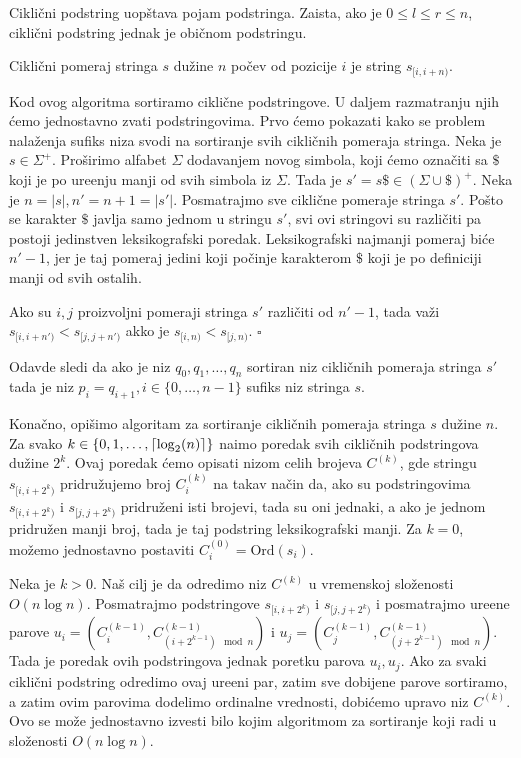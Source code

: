 Cikli\v cni podstring uop\v stava pojam podstringa. Zaista, ako je $0 \leq l \leq r \leq n$, cikli\v cni podstring jednak je obi\v cnom podstringu.

\begin{dfn}
Cikli\v cni pomeraj stringa $s$ du\v zine $n$ po\v cev od pozicije $i$ je string $s_{[i, i+n)}$.
\end{dfn}

Kod ovog algoritma sortiramo cikli\v cne podstringove. U daljem razmatranju njih \' cemo jednostavno zvati podstringovima. Prvo \' cemo pokazati kako se problem nala\v zenja sufiks niza svodi na sortiranje svih cikli\v cnih pomeraja stringa. Neka je $s \in \Sigma^+$. Pro\v sirimo alfabet $\Sigma$ dodavanjem novog simbola, koji \' cemo ozna\v citi sa $\$$ koji je po ure\dj enju manji od svih simbola iz $\Sigma$. Tada je $s' = s\$ \in (\Sigma \cup {\$})^+$. Neka je $n = |s|, n' = n+1 = |s'|$. Posmatrajmo sve cikli\v cne pomeraje stringa $s'$. Po\v sto se karakter $\$$ javlja samo jednom u stringu $s'$, svi ovi stringovi su razli\v citi pa postoji jedinstven leksikografski poredak. Leksikografski najmanji pomeraj bi\' ce $n'-1$, jer je taj pomeraj jedini koji po\v cinje karakterom $\$$ koji je po definiciji manji od svih ostalih.

\begin{thm}
Ako su $i,j$ proizvoljni pomeraji stringa $s'$ razli\v citi od $n'-1$, tada va\v zi $s_{[i, i+n')} < s_{[j, j+n')}$ akko je $s_{[i, n)} < s_{[j, n)}$. \hfill $\square$
\end{thm}

Odavde sledi da ako je niz $q_0, q_1, \ldots, q_n$ sortiran niz cikli\v cnih pomeraja stringa $s'$ tada je niz $p_i = q_{i+1}, i \in \{0, \ldots, n-1\}$ sufiks niz stringa $s$.

Kona\v cno, opi\v simo algoritam za sortiranje cikli\v cnih pomeraja stringa $s$ du\v zine $n$. Za svako $k \in \{0, 1, \ldots, \left \lceil \log_2(n) \right \rceil \}$ na\dj imo poredak svih cikli\v cnih podstringova du\v zine $2^k$. Ovaj poredak \' cemo opisati nizom celih brojeva $C^{(k)}$, gde stringu $s_{[i, i+2^k)}$ pridru\v zujemo broj $C^{(k)}_i$ na takav na\v cin da, ako su podstringovima $s_{[i, i+2^k)}$ i $s_{[j, j+2^k)}$ pridru\v zeni isti brojevi, tada su oni jednaki, a ako je jednom pridru\v zen manji broj, tada je taj podstring leksikografski manji. Za $k=0$, mo\v zemo jednostavno postaviti $C^{(0)}_i = \text{Ord}(s_i)$.

Neka je $k>0$. Na\v s cilj je da odredimo niz $C^{(k)}$ u vremenskoj slo\v zenosti $O(n \log n)$. Posmatrajmo podstringove $s_{[i, i+2^k)}$ i $s_{[j, j+2^k)}$ i posmatrajmo ure\dj ene parove $u_i = (C^{(k-1)}_i, C^{(k-1)}_{(i+2^{k-1}) \mod n })$ i $u_j = (C^{(k-1)}_j, C^{(k-1)}_{(j+2^{k-1}) \mod n })$. Tada je poredak ovih podstringova jednak poretku parova $u_i, u_j$. Ako za svaki cikli\v cni podstring odredimo ovaj ure\dj eni par, zatim sve dobijene parove sortiramo, a zatim ovim parovima dodelimo ordinalne vrednosti, dobi\' cemo upravo niz $C^{(k)}$. Ovo se mo\v ze jednostavno izvesti bilo kojim algoritmom za sortiranje koji radi u slo\v zenosti $O(n \log n)$.

